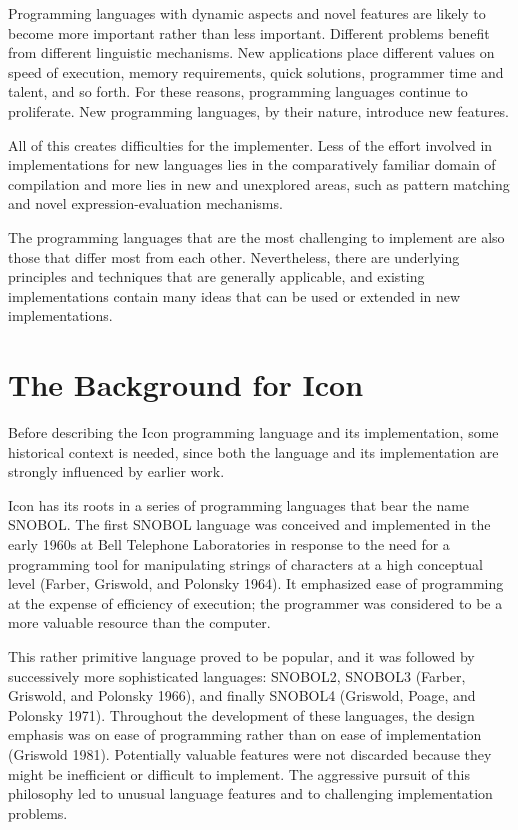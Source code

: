Programming languages with dynamic aspects and novel features are
likely to become more important rather than less important. Different
problems benefit from different linguistic mechanisms. New
applications place different values on speed of execution, memory
requirements, quick solutions, programmer time and talent, and so
forth. For these reasons, programming languages continue to
proliferate. New programming languages, by their nature, introduce new
features.


All of this creates difficulties for the implementer. Less of the
effort involved in implementations for new languages lies in the
comparatively familiar domain of compilation and more lies in new and
unexplored areas, such as pattern matching and novel
expression-evaluation mechanisms.

The programming languages that are the most challenging to implement
are also those that differ most from each other.  Nevertheless, there
are underlying principles and techniques that are generally
applicable, and existing implementations contain many ideas that can
be used or extended in new implementations.

\section{The Background for Icon}

Before describing the Icon programming language and its
implementation, some historical context is needed, since both the
language and its implementation are strongly influenced by earlier
work.

Icon has its roots in a series of programming languages that bear the
name SNOBOL. The first SNOBOL language was conceived and implemented
in the early 1960s at Bell Telephone Laboratories in response to the
need for a programming tool for manipulating strings of characters at
a high conceptual level (Farber, Griswold, and Polonsky 1964). It
emphasized ease of programming at the expense of efficiency of
execution; the programmer was considered to be a more valuable
resource than the computer.

This rather primitive language proved to be popular, and it was
followed by successively more sophisticated languages: SNOBOL2,
SNOBOL3 (Farber, Griswold, and Polonsky 1966), and finally SNOBOL4
(Griswold, Poage, and Polonsky 1971).  Throughout the development of
these languages, the design emphasis was on ease of programming rather
than on ease of implementation (Griswold 1981). Potentially valuable
features were not discarded because they might be inefficient or
difficult to implement. The aggressive pursuit of this philosophy led
to unusual language features and to challenging implementation
problems.

